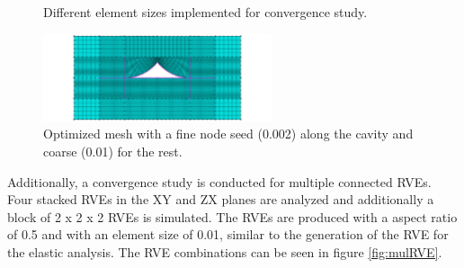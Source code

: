 \begin{figure}
  \caption{Different element sizes implemented for convergence study.}
  \label{fig:meshes}
\end{figure}
\begin{figure}[H]
    \centering
    \includegraphics[width=0.60\textwidth]{chapter_7_non-elasticmodelling/figures/meshopt.png}
    \caption{Optimized mesh with a fine node seed (0.002) along the cavity and coarse (0.01) for the rest.}
    \label{fig:meshopt}
\end{figure}

Additionally, a convergence study is conducted for multiple connected RVEs. Four stacked RVEs in the XY and ZX planes are analyzed and additionally a block of 2 x 2 x 2 RVEs is simulated. The RVEs are produced with a aspect ratio of 0.5 and with an element size of 0.01, similar to the generation of the RVE for the elastic analysis. The RVE combinations can be seen in figure \ref{fig:mulRVE}.

